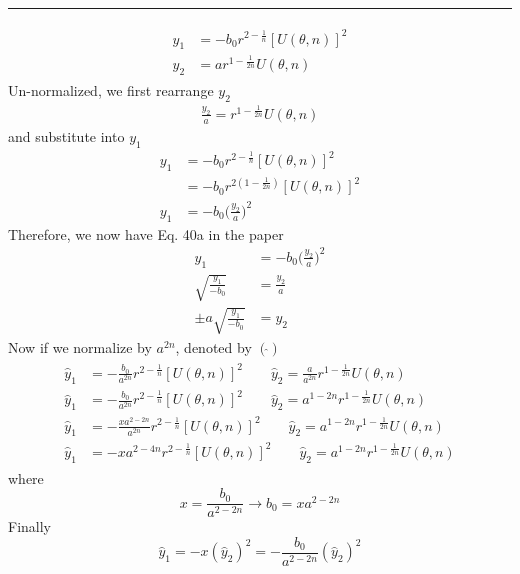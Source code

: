 \documentclass[12pt,3p]{article}
\numberwithin{equation}{section}
\begin{document}
\noindent\rule{\linewidth}{0.5pt} %
\begin{align}\label{EqCoord}
\begin{split}
y_1 &= -b_{0} r^{2-\frac{1}{n}}[U(\theta, n)]^{2} \\
y_2 &= a r^{1 - \frac{1}{2n}} U (\theta, n) 
\end{split}
\end{align}
Un-normalized, we first rearrange $y_2$
\begin{align*}
\frac{y_2}{a} = r^{1 - \frac{1}{2n}} U (\theta, n) 
\end{align*}
and substitute into $y_1$
\begin{align}
y_1 &= -b_{0} r^{2-\frac{1}{n}} [U(\theta, n)]^{2} \\
	&= -b_{0} r^{2(1 - \frac{1}{2n})} [U(\theta, n)]^{2} \\
y_1 &= -b_0 \bigg( \frac{y_2}{a} \bigg)^2
\end{align}
Therefore, we now have Eq. 40a in the paper
\begin{align}\label{Eq40a}
y_1 &= -b_0 \bigg( \frac{y_2}{a} \bigg)^2 \\
\sqrt{\frac{y_1}{-b_0}} &= \frac{y_2}{a} \\
\pm a \sqrt{\frac{y_1}{-b_0}} &= y_2 
\end{align}
Now if we normalize by $a^{2n}$, denoted by $(\hat{})$
\begin{align}
\begin{split}
\hat{y}_1 &= - \frac{b_{0}}{a^{2n}} r^{2-\frac{1}{n}}[U(\theta, n)]^{2} \quad \quad \hat{y}_2 = \frac{a}{a^{2n}} r^{1 - \frac{1}{2n}} U (\theta, n) \\
\hat{y}_1 &= - \frac{b_{0}}{a^{2n}} r^{2-\frac{1}{n}}[U(\theta, n)]^{2} \quad \quad \hat{y}_2 = a^{1-2n} r^{1 - \frac{1}{2n}} U (\theta, n) \\
\hat{y}_1 &= - \frac{x a^{2-2n}}{a^{2n}} r^{2-\frac{1}{n}}[U(\theta, n)]^{2} \quad \quad \hat{y}_2 = a^{1-2n} r^{1 - \frac{1}{2n}} U (\theta, n) \\
\hat{y}_1 &= - x a^{2-4n} r^{2-\frac{1}{n}}[U(\theta, n)]^{2} \quad \quad \hat{y}_2 = a^{1-2n} r^{1 - \frac{1}{2n}} U (\theta, n) 
\end{split}
\end{align}
where 
\begin{equation}
x = \frac{b_0}{a^{2-2n}} \rightarrow b_0 = x a^{2-2n}
\end{equation}
Finally
\begin{equation}
\hat{y}_1 = - x (\hat{y}_2)^2 = - \frac{b_0}{a^{2-2n}} (\hat{y}_2)^2 
\end{equation}
\end{document}
